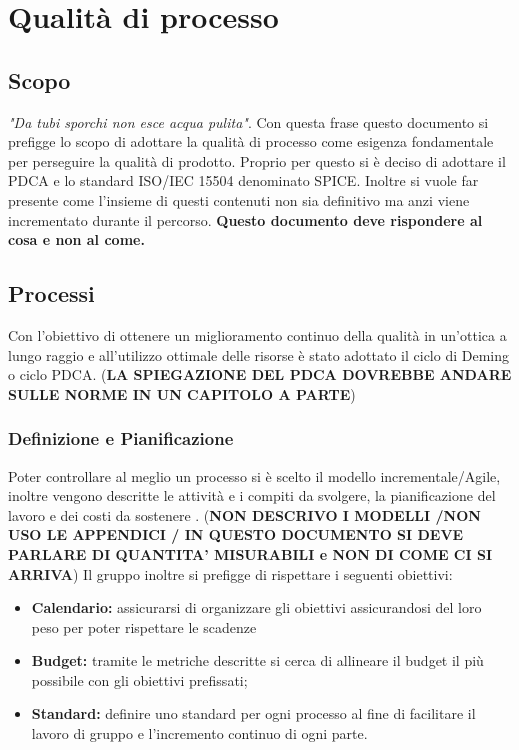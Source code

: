 \section{Qualità di processo}
\subsection{Scopo}
\textit{"Da tubi sporchi non esce acqua pulita"}.
\newline
Con questa frase questo documento si prefigge  lo scopo di adottare la qualità di processo come esigenza fondamentale per perseguire la qualità di prodotto. Proprio per questo si è deciso di adottare il PDCA e lo standard ISO/IEC 15504 denominato SPICE. Inoltre si vuole far presente come l'insieme di questi contenuti non sia definitivo ma anzi viene incrementato durante il percorso. \textbf{Questo documento deve rispondere al cosa e non al come.}
\subsection{Processi}
Con l'obiettivo di ottenere un miglioramento continuo della qualità in un'ottica a lungo raggio e all'utilizzo ottimale delle risorse è stato adottato il ciclo di Deming o ciclo PDCA. (\textbf{LA SPIEGAZIONE DEL PDCA DOVREBBE ANDARE SULLE NORME IN UN CAPITOLO A PARTE})
\subsubsection{Definizione e Pianificazione}
Poter controllare al meglio un processo si è scelto il modello incrementale/Agile, inoltre vengono descritte le attività e i compiti da svolgere, la pianificazione del lavoro e dei costi da sostenere . (\textbf{NON DESCRIVO I MODELLI /NON USO LE APPENDICI / IN QUESTO DOCUMENTO SI DEVE PARLARE DI QUANTITA' MISURABILI e NON DI COME CI SI ARRIVA}) Il gruppo inoltre si prefigge di rispettare i seguenti obiettivi:
\begin{itemize}
		\item{\textbf{Calendario:} assicurarsi di organizzare gli obiettivi assicurandosi del loro peso per poter rispettare le scadenze}
		\item{\textbf{Budget:} tramite le metriche descritte si cerca di allineare il budget il più possibile con gli obiettivi prefissati;}
		\item{\textbf{Standard:} definire uno standard per ogni processo al fine di facilitare il lavoro di gruppo e l'incremento continuo di ogni parte.}
\end{itemize} 
